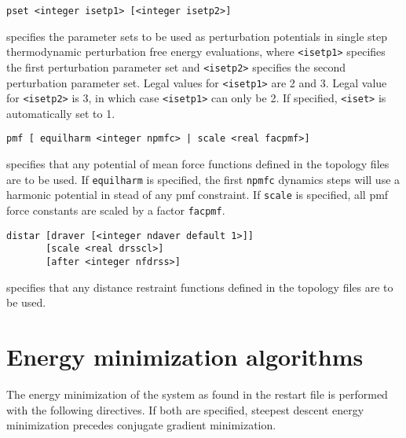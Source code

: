 \begin{description}
\item
\begin{verbatim}
pset <integer isetp1> [<integer isetp2>]
\end{verbatim}
specifies the parameter sets to be used as perturbation potentials
in single step thermodynamic perturbation free energy evaluations,
where \verb+<isetp1>+ specifies the first perturbation parameter set and
\verb+<isetp2>+ specifies the second perturbation parameter set. Legal
values for \verb+<isetp1>+ are 2 and 3. Legal value for \verb+<isetp2>+ is
3, in which case \verb+<isetp1>+ can only be 2. If specified, \verb+<iset>+
is automatically set to 1.

\item
\begin{verbatim}
pmf [ equilharm <integer npmfc> | scale <real facpmf>]
\end{verbatim}
specifies that any potential of mean force functions defined in the
topology files are to be used. If \verb+equilharm+ is specified, the
first \verb+npmfc+ dynamics steps will use a harmonic potential
in stead of any pmf constraint. If \verb+scale+ is specified, all
pmf force constants are scaled by a factor \verb+facpmf+.

\item
\begin{verbatim}
distar [draver [<integer ndaver default 1>]] 
       [scale <real drsscl>]
       [after <integer nfdrss>]
\end{verbatim}
specifies that any distance restraint functions defined in the
topology files are to be used. 



\end{description}

\section{Energy minimization algorithms}
The energy minimization of the system as found in the restart file 
is performed with the following directives. If both are specified,
steepest descent energy minimization precedes conjugate gradient 
minimization.

